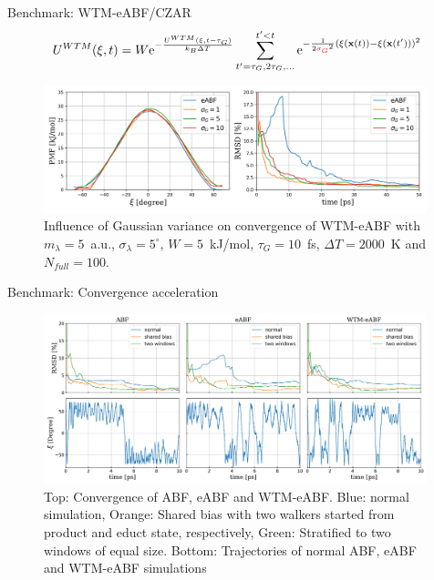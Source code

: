 \documentclass[10pt]{beamer}
\begin{document}
\begin{frame}{Benchmark: WTM-eABF/CZAR}
\begin{equation}
  U^{WTM}(\xi,t)=W\text{e}^{-\frac{U^{WTM}(\xi,t-\tau_G)}{k_B \Delta T}}\sum_{t'=\tau_G,2\tau_G,...}^{t'<t} \text{e}^{-\frac{1}{2{\color{red}{\sigma_{G}}}^{2}} (\xi(\textbf{x}(t))-\xi(\textbf{x}(t')))^2 }
\end{equation}
\begin{figure}[H]
  \centering
    \includegraphics[width=0.99\textwidth]{bilder/benchmark/meta_eABF_benchmark_var}
   \caption{Influence of Gaussian variance on convergence of WTM-eABF with $m_\lambda=5$~a.u., $\sigma_\lambda=5^\circ$, $W=5$~kJ/mol, $\tau_G=10$~fs, $\Delta T=2000$~K and $N_{full}=100$.}
\end{figure}
\end{frame}

\begin{frame}{Benchmark: Convergence acceleration}
\begin{figure}[H]
  \centering
    \includegraphics[width=0.99\textwidth]{bilder/benchmark/ABF_acc_benchmark}
   \caption{Top: Convergence of ABF, eABF and WTM-eABF. Blue: normal simulation, Orange: Shared bias with two walkers started from product and educt state, respectively, Green: Stratified to two windows of equal size.
  Bottom: Trajectories of normal ABF, eABF and WTM-eABF simulations}
\end{figure}
\end{frame}
\end{document}
